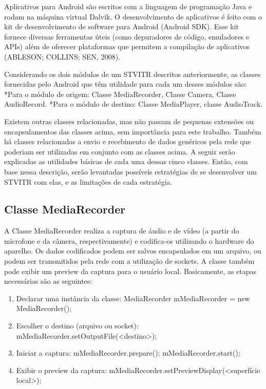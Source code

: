 \documentclass{acm_proc_article-sp}
\begin{document}
Aplicativos para Android são escritos com a linguagem de programação Java e rodam na máquina virtual Dalvik. O desenvolvimento de aplicativos é feito com o kit de desenvolvimento de software para Android (Android SDK). Esse kit fornece diversas ferramentas úteis (como depuradores de código, emuladores e APIs) além de oferecer plataformas que permitem a compilação de aplicativos (ABLESON; COLLINS; SEN, 2008).

Considerando os dois módulos de um STVITR descritos anteriormente, as classes fornecidas pelo Android que têm utilidade para cada um desses módulos são:
*Para o módulo de origem: Classe MediaRecorder, Classe Camera, Classe AudioRecord.
*Para o módulo de destino: Classe MediaPlayer, classe AudioTrack.

Existem outras classes relacionadas, mas não passam de pequenas extensões ou encapsulamentos das classes acima, sem importância para este trabalho. Também há classes relacionadas a envio e recebimento de dados genéricos pela rede que poderiam ser utilizadas em conjunto com as classes acima. A seguir serão explicadas as utilidades básicas de cada uma dessas cinco classes. Então, com base nessa descrição, serão levantadas possíveis estratégias de se desenvolver um STVITR com elas, e as limitações de cada estratégia.

\subsection{Classe MediaRecorder}
A Classe MediaRecorder realiza a captura de áudio e de vídeo (a partir do microfone e da câmera, respectivamente) e codifica-os utilizando o hardware do aparelho. Os dados codificados podem ser salvos encapsulados em um arquivo, ou podem ser transmitidos pela rede com a utilização de sockets. A classe também pode exibir um preview da captura para o usuário local.
Basicamente, as etapas necessárias são as seguintes:
\begin{enumerate}
 \item Declarar uma instância da classe:
MediaRecorder mMediaRecorder = new MediaRecorder();
 \item Escolher o destino (arquivo ou socket):
mMediaRecorder.setOutputFile(<destino>);
 \item Iniciar a captura:
mMediaRecorder.prepare();
mMediaRecorder.start();
 \item Exibir o preview da captura:
mMediaRecorder.setPreviewDisplay(<superfície local>);
\end{enumerate}
\end{document}
